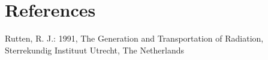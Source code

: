 \documentclass{aa}   %
\begin{document}

\section{References}
Rutten, R. J.: 1991, The Generation and Transportation of Radiation, Sterrekundig Instituut Utrecht, The Netherlands

\end{document}
